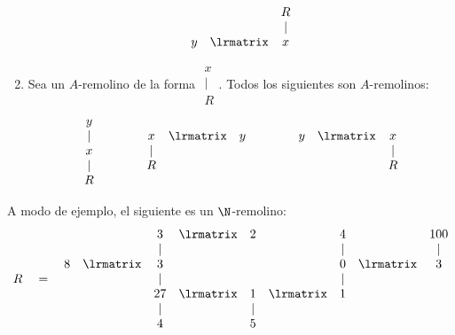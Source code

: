 \begin{enumerate}
$$        \begin{matrix}
            &   & R \\
            &   & |\\
          y & \lrmatrix & x
        \end{matrix}$$
    \item Sea un $A$-remolino de la forma $\begin{matrix}x \\ | \\ R \end{matrix}$.
    Todos los siguientes son $A$-remolinos:
      $$\begin{matrix}
        y\\
        |\\
        x\\
        |\\
        R
      \end{matrix}
        \hspace{15mm}
        \begin{matrix}
          x & \lrmatrix & y \\
          | &   &\\
          R &   &
        \end{matrix}
        \hspace{15mm}
        \begin{matrix}
           y & \lrmatrix & x \\
             &   & |\\
             &   & R
         \end{matrix}$$
\end{enumerate}
A modo de ejemplo, el siguiente es un $\N$-remolino:
$$ R \quad = \quad
  \begin{matrix}
    &           & 3  & \lrmatrix & 2 &           & 4 &           & 100\\
    &           & |  &           &   &           & | &           & |\\
  8 & \lrmatrix & 3  &           &   &           & 0 & \lrmatrix & 3\\
    &           & |  &           &   &           & | &           &\\
    &           & 27 & \lrmatrix & 1 & \lrmatrix & 1 &           &\\
    &           & |  &           & | &           &   &           &\\
    &           & 4  &           & 5 &           &   &           &
  \end{matrix}
$$
